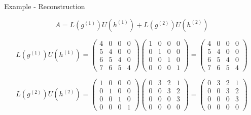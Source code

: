 \begin{frame}{Example - Reconstruction}
    
    \[
        A = L(g^{(1)})U(h^{(1)}) + L(g^{(2)})U(h^{(2)})
    \]
    
    \vspace{0.5em}
    
    \[
        L(g^{(1)})U(h^{(1)}) = 
        \begin{pmatrix}
            4 & 0 & 0 & 0 \\
            5 & 4 & 0 & 0 \\
            6 & 5 & 4 & 0 \\
            7 & 6 & 5 & 4
        \end{pmatrix}
        \begin{pmatrix}
            1 & 0 & 0 & 0 \\
            0 & 1 & 0 & 0 \\
            0 & 0 & 1 & 0 \\
            0 & 0 & 0 & 1
        \end{pmatrix}
        =
        \begin{pmatrix}
            4 & 0 & 0 & 0 \\
            5 & 4 & 0 & 0 \\
            6 & 5 & 4 & 0 \\
            7 & 6 & 5 & 4
        \end{pmatrix}
    \]
    
    \vspace{0.8em}
    
    \[
        L(g^{(2)})U(h^{(2)}) = 
        \begin{pmatrix}
            1 & 0 & 0 & 0 \\
            0 & 1 & 0 & 0 \\
            0 & 0 & 1 & 0 \\
            0 & 0 & 0 & 1
        \end{pmatrix}
        \begin{pmatrix}
            0 & 3 & 2 & 1 \\
            0 & 0 & 3 & 2 \\
            0 & 0 & 0 & 3 \\
            0 & 0 & 0 & 0
        \end{pmatrix}
        =
        \begin{pmatrix}
            0 & 3 & 2 & 1 \\
            0 & 0 & 3 & 2 \\
            0 & 0 & 0 & 3 \\
            0 & 0 & 0 & 0
        \end{pmatrix}
    \]
    
\end{frame}